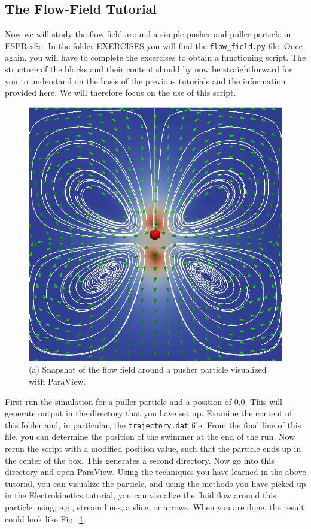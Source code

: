 \documentclass[aip,jcp,reprint,a4paper,onecolumn,amsmath]{revtex4-1}
\newcommand\code{\lstinline}
\newcommand{\es}{\mbox{\textsf{ESPResSo}}\xspace}
\begin{document}
\subsection{\label{sub:fftut}The Flow-Field Tutorial}

Now we will study the flow field around a simple pusher and puller particle in \es{}. In the folder EXERCISES you will find the \code{flow_field.py} file. Once again, you will have to complete the excercises to obtain a functioning script. The structure of the blocks and their content should by now be straightforward for you to understand on the basis of the previous tutorials and the information provided here. We will therefore focus on the use of this script.

\begin{figure}[!htb]
\begin{center}
\includegraphics[scale=0.75]{FIGURES/flow_field}
\end{center}
\caption{\label{fig:flow_field}(a) Snapshot of the flow field around a pusher particle visualized with ParaView.}
\end{figure}

First run the simulation for a puller particle and a position of 0.0. This will generate output in the directory that you have set up. Examine the content of this folder and, in particular, the \code{trajectory.dat} file. From the final line of this file, you can determine the position of the swimmer at the end of the run. Now rerun the script with a modified position value, such that the particle ends up in the center of the box. This generates a second directory. Now go into this directory and open ParaView. Using the techniques you have learned in the above tutorial, you can visualize the particle, and using the methods you have picked up in the Electrokinetics tutorial, you can visualize the fluid flow around this particle using, e.g., stream lines, a slice, or arrows. When you are done, the result could look like Fig.~\ref{fig:flow_field}.
\end{document}
